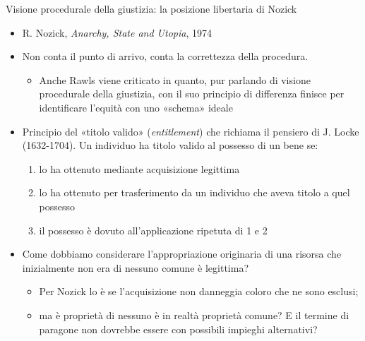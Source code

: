 \documentclass[aspectratio=64,11pt]{beamer}
\begin{document}
\begin{frame}{Visione procedurale della giustizia: la posizione libertaria di Nozick}
\begin{itemize}
\item R. Nozick, \emph{Anarchy, State and Utopia}, 1974
\item Non conta il punto di arrivo, conta la correttezza della procedura.
\begin{itemize}
\item Anche Rawls viene criticato in quanto, pur parlando di visione procedurale
della giustizia, con il suo principio di differenza finisce per
identificare l'equità con uno «schema» ideale
\end{itemize}
\item Principio del «titolo valido» (\emph{entitlement}) che richiama il pensiero di
J. Locke (1632-1704). Un individuo ha titolo valido al possesso di un bene
se:
\begin{enumerate}
\item lo ha ottenuto mediante acquisizione legittima
\item lo ha ottenuto per trasferimento da un individuo che aveva titolo a
quel possesso
\item il possesso è dovuto all'applicazione ripetuta di 1 e 2
\end{enumerate}
\item Come dobbiamo considerare l'appropriazione originaria di una risorsa che
inizialmente non era di nessuno comune è legittima?
\begin{itemize}
\item Per Nozick lo è se l'acquisizione non danneggia coloro che ne sono
esclusi;
\item ma è proprietà di nessuno è in realtà proprietà comune? E il termine di
paragone non dovrebbe essere con possibili impieghi alternativi?
\end{itemize}
\end{itemize}
\end{frame}
\end{document}
